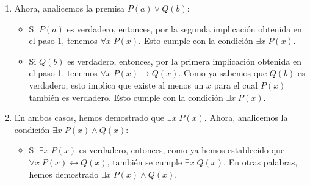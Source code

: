 \documentclass{article}
\begin{document}
\begin{enumerate}[label=\color{red}\textbf{\arabic*)}, leftmargin=*]
\begin{enumerate}[label=\arabic*)]
      \item Ahora, analicemos la premisa $P(a) \vee Q(b)$:
        \begin{itemize}[label=$-$]
         \item  Si $P(a)$ es verdadero, entonces, por la segunda implicación obtenida en el paso 1, tenemos $\forall x\;P(x)$. Esto cumple con la condición $\exists x\;P(x)$.
         \item  Si $Q(b)$ es verdadero, entonces, por la primera implicación obtenida en el paso 1, tenemos $\forall x\;P(x) \longrightarrow Q(x)$. Como ya sabemos que $Q(b)$ es verdadero, esto implica que existe al menos un $x$ para el cual $P(x)$ también es verdadero. Esto cumple con la condición $\exists x\;P(x)$.
        \end{itemize}
      
      \item  En ambos casos, hemos demostrado que $\exists x\;P(x)$. Ahora, analicemos la condición $\exists x\;P(x) \wedge Q(x)$:
         \begin{itemize}[label=$-$]
         \item  Si $\exists x\;P(x)$ es verdadero, entonces, como ya hemos establecido que $\forall x\;P(x) \longleftrightarrow Q(x)$, también se cumple $\exists x\;Q(x)$. En otras palabras, hemos demostrado $\exists x\;P(x) \wedge Q(x)$.
         \end{itemize}
      \end{enumerate}
      

\end{enumerate}
\end{document}
